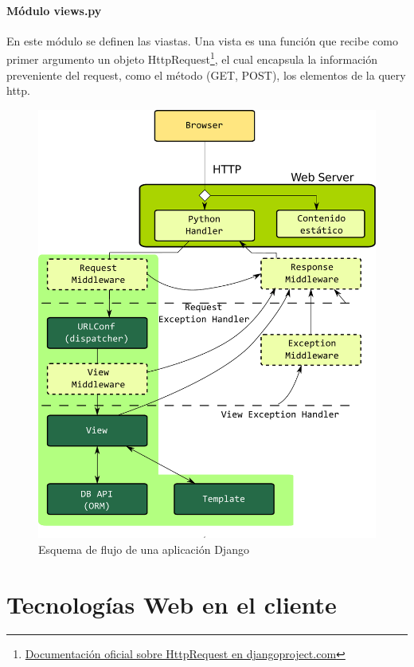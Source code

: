 \documentclass[a4paper]{report}
\begin{document}
\subsubsection*{Módulo views.py}
En este módulo se definen las viastas. Una vista es una función que recibe como primer
argumento un objeto HttpRequest\footnote{
\href{http://docs.djangoproject.com/en/dev/ref/request-response/\#httprequest-objects}
{Documentación oficial sobre HttpRequest en djangoproject.com}}, el cual encapsula la información preveniente del request, 
como el método (GET, POST), los elementos de la query http.
\begin{figure}[htp]
\centering
\includegraphics[scale=0.40]{img/django_strucure.pdf}
\caption{Esquema de flujo de una aplicación Django}\label{fig:erptsqfit}
\end{figure}




\chapter{Tecnologías Web en el cliente}
\end{document}
